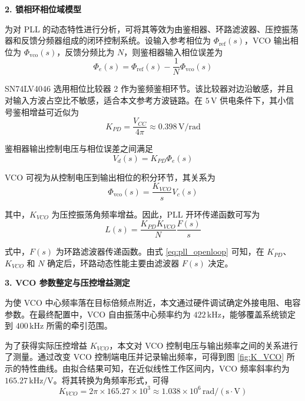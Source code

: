 \textbf{2. 锁相环相位域模型}

为对 PLL 的动态特性进行分析，可将其等效为由鉴相器、环路滤波器、压控振荡器和反馈分频器组成的闭环控制系统。设输入参考相位为 $\Phi_{\mathrm{ref}}(s)$，VCO 输出相位为 $\Phi_{\mathrm{vco}}(s)$，反馈分频比为 $N$，则鉴相器输入相位误差为
\begin{equation}
\label{eq:pll_phase_error}
\Phi_e(s)
=
\Phi_{\mathrm{ref}}(s)
-
\frac{1}{N}\Phi_{\mathrm{vco}}(s)
\end{equation}

SN74LV4046 选用相位比较器 2 作为鉴频鉴相环节。该比较器对边沿敏感，并且对输入方波占空比不敏感，适合本文参考方波链路。在 $5\,\mathrm{V}$ 供电条件下，其小信号鉴相增益可近似为
\begin{equation}
\label{eq:kpd}
K_{PD}
=
\frac{V_{CC}}{4\pi}
\approx
0.398\,\mathrm{V/rad}
\end{equation}

鉴相器输出控制电压与相位误差之间满足
\begin{equation}
\label{eq:vd}
V_d(s)=K_{PD}\Phi_e(s)
\end{equation}

VCO 可视为从控制电压到输出相位的积分环节，其关系为
\begin{equation}
\label{eq:vco_phase}
\Phi_{\mathrm{vco}}(s)
=
\frac{K_{VCO}}{s}V_c(s)
\end{equation}

其中，$K_{VCO}$ 为压控振荡角频率增益。因此，PLL 开环传递函数可写为
\begin{equation}
\label{eq:pll_openloop}
L(s)
=
\frac{K_{PD}K_{VCO}}{N}
\frac{F(s)}{s}
\end{equation}

式中，$F(s)$ 为环路滤波器传递函数。由式 \eqref{eq:pll_openloop} 可知，在 $K_{PD}$、$K_{VCO}$ 和 $N$ 确定后，环路动态性能主要由滤波器 $F(s)$ 决定。

\textbf{3. VCO 参数整定与压控增益测定}

为使 VCO 中心频率落在目标倍频点附近，本文通过硬件调试确定外接电阻、电容参数。在最终配置中，VCO 自由振荡中心频率约为 $422\,\mathrm{kHz}$，能够覆盖系统锁定到 $400\,\mathrm{kHz}$ 所需的牵引范围。

为了获得实际压控增益 $K_{VCO}$，本文对 VCO 控制电压与输出频率之间的关系进行了测量。通过改变 VCO 控制端电压并记录输出频率，可得到图 \ref{fig:K_VCO} 所示的特性曲线。由拟合结果可知，在近似线性工作区间内，VCO 频率斜率约为 $165.27\,\mathrm{kHz/V}$。将其转换为角频率形式，可得
\begin{equation}
\label{eq:kvco}
K_{VCO}
=
2\pi\times165.27\times10^3
\approx
1.038\times10^6\,\mathrm{rad/(s\cdot V)}
\end{equation}

